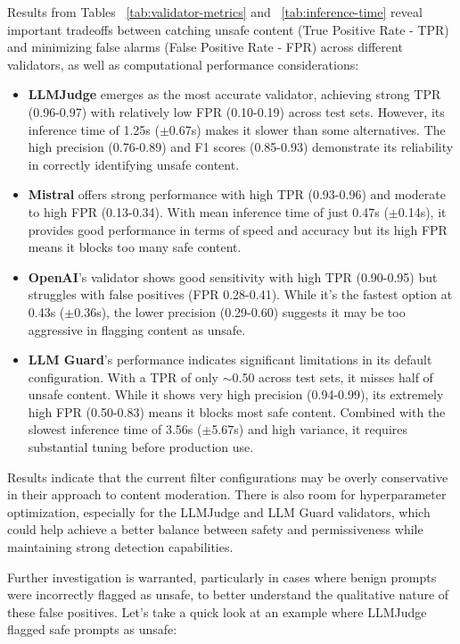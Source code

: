Results from Tables ~\ref{tab:validator-metrics} and ~\ref{tab:inference-time} reveal important tradeoffs between catching unsafe content (True Positive Rate - TPR) and minimizing false alarms (False Positive Rate - FPR) across different validators, as well as computational performance considerations:

\begin{itemize}
\item \textbf{LLMJudge} emerges as the most accurate validator, achieving strong TPR (0.96-0.97) with relatively low FPR (0.10-0.19) across test sets. However, its inference time of 1.25s ($\pm$0.67s) makes it slower than some alternatives. The high precision (0.76-0.89) and F1 scores (0.85-0.93) demonstrate its reliability in correctly identifying unsafe content.
  
\item \textbf{Mistral} offers strong performance with high TPR (0.93-0.96) and moderate to high FPR (0.13-0.34). With mean inference time of just 0.47s ($\pm$0.14s), it provides good performance in terms of speed and accuracy but its high FPR means it blocks too many safe content.
  
\item \textbf{OpenAI}'s validator shows good sensitivity with high TPR (0.90-0.95) but struggles with false positives (FPR 0.28-0.41). While it's the fastest option at 0.43s ($\pm$0.36s), the lower precision (0.29-0.60) suggests it may be too aggressive in flagging content as unsafe.
  
\item \textbf{LLM Guard}'s performance indicates significant limitations in its default configuration. With a TPR of only $\sim$0.50 across test sets, it misses half of unsafe content. While it shows very high precision (0.94-0.99), its extremely high FPR (0.50-0.83) means it blocks most safe content. Combined with the slowest inference time of 3.56s ($\pm$5.67s) and high variance, it requires substantial tuning before production use.
\end{itemize}

Results indicate that the current filter configurations may be overly conservative in their approach to content moderation. There is also room for hyperparameter optimization, especially for the LLMJudge and LLM Guard validators, which could help achieve a better balance between safety and permissiveness while maintaining strong detection capabilities.

Further investigation is warranted, particularly in cases where benign prompts were incorrectly flagged as unsafe, to better understand the qualitative nature of these false positives. Let's take a quick look at an example where LLMJudge flagged safe prompts as unsafe:


